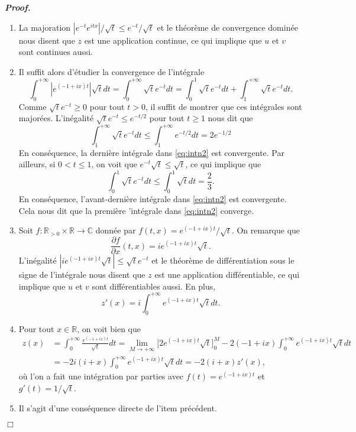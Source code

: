 \documentclass[11pt,a4paper]{article}
\newcommand{\RR}{\mathbb{R}}
\newenvironment{preuve}[1][]
{\vskip 2mm  \noindent\emph{\bf Proof#1. }}{$\Box$ \vskip 2mm}
\let\geq\geqslant
\let\leq\leqslant
\newcommand{\C}{\mathbb{C}}
\begin{document}
\begin{preuve}
\begin{enumerate}
			\item La majoration $|e^{-t} e^{itx}|/\sqrt{t} \leq e^{-t} /\sqrt{t}$ et le théorème de convergence dominée nous disent que $z$ 
			est une application continue, ce qui implique que $u$ et $v$ sont continues aussi. 
			
			\item Il suffit alors d'étudier la convergence de l'intégrale 
			\begin{equation}
			\label{eq:intn2}
			\int_0^{+\infty} |e^{(-1+ix)t}| \sqrt{t} dt = \int_0^{+\infty} \sqrt{t} e^{-t} dt = \int_0^{1} \sqrt{t} e^{-t} dt + \int_1^{+\infty} \sqrt{t} e^{-t} dt.
			\end{equation}
			Comme $\sqrt{t} e^{-t} \geq 0$ pour tout $t >0$, il suffit de montrer que ces intégrales sont majorées. 
			L'inégalité $\sqrt{t} e^{-t} \leq e^{-t/2}$ pour tout $t \geq 1$ nous dit que 
			\[     \int_1^{+\infty} \sqrt{t} e^{-t} dt \leq \int_1^{+\infty} e^{-t/2} dt = 2 e^{-1/2}     \]
			En conséquence, la dernière intégrale dans \eqref{eq:intn2} est convergente. 
			Par ailleurs, si $0 < t \leq 1$, on voit que $e^{-t} \sqrt{t} \leq \sqrt{t}$, ce qui implique que 
			\[     \int_0^{1} \sqrt{t} e^{-t} dt \leq \int_0^{1} \sqrt{t} dt = \frac{2}{3}.     \]
			En conséquence, l'avant-dernière intégrale dans \eqref{eq:intn2} est convergente. 
			Cela nous dit que la première 'intégrale dans \eqref{eq:intn2} converge. 
			
			\item Soit $f : \RR_{>0} \times \RR \rightarrow \C$ donnée par $f(t,x) = e^{(-1+ix)t}/\sqrt{t}$. 
			On remarque que 
			\[     \frac{\partial f}{\partial x}(t,x) = i e^{(-1+ix)t} \sqrt{t}.     \]
			L'inégalité $|i e^{(-1+ix)t} \sqrt{t}| \leq \sqrt{t} e^{-t}$ et le théorème de différentiation sous le signe de l'intégrale nous disent que $z$ 
			est une application différentiable, ce qui implique que $u$ et $v$ sont différentiables aussi. 
			En plus, 
			\[     z'(x) = i \int_0^{+\infty} e^{(-1+ix)t} \sqrt{t} dt.     \]
			
			\item Pour tout $x \in \RR$, on voit bien que 
			\begin{align*}
			z(x) &= \int_0^{+\infty} \frac{e^{(-1+ix)t}}{\sqrt{t}}dt = \underset{M \rightarrow + \infty}{\lim} \bigg[ 2 e^{(-1+ix)t} \sqrt{t} \bigg]_{0}^{M} - 2(-1+ix) \int_0^{+\infty} e^{(-1+ix)t} \sqrt{t} dt 
			\\
			&= - 2i(i+x) \int_0^{+\infty} e^{(-1+ix)t} \sqrt{t} dt = - 2 (i+x) z'(x),     
			\end{align*}
			où l'on a fait une intégration par parties avec $f(t) = e^{(-1+ix)t}$ et $g'(t) = 1/\sqrt{t}$.
			
			\item Il s'agit d'une conséquence directe de l'item précédent. 
		\end{enumerate}
	\end{preuve}
	
\end{document}
